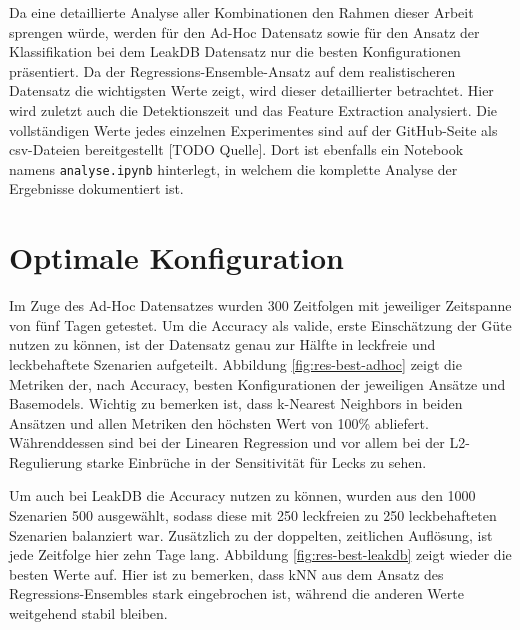Da eine detaillierte Analyse aller Kombinationen den Rahmen dieser Arbeit sprengen würde, werden für den
 Ad-Hoc Datensatz sowie für den Ansatz der Klassifikation bei dem LeakDB Datensatz nur die besten Konfigurationen
 präsentiert. Da der Regressions-Ensemble-Ansatz auf dem realistischeren Datensatz die wichtigsten Werte zeigt,
 wird dieser detaillierter betrachtet. Hier wird zuletzt auch die Detektionszeit und das Feature Extraction
 analysiert. Die vollständigen Werte jedes einzelnen Experimentes sind auf der GitHub-Seite als csv-Dateien
 bereitgestellt [TODO Quelle]. Dort ist ebenfalls ein Notebook namens \texttt{analyse.ipynb} hinterlegt, in welchem
 die komplette Analyse der Ergebnisse dokumentiert ist.

\section{Optimale Konfiguration}

Im Zuge des Ad-Hoc Datensatzes wurden 300 Zeitfolgen mit jeweiliger Zeitspanne von fünf Tagen getestet. Um die
 Accuracy als valide, erste Einschätzung der Güte nutzen zu können, ist der Datensatz genau zur Hälfte in
 leckfreie und leckbehaftete Szenarien aufgeteilt. Abbildung \ref{fig:res-best-adhoc} zeigt die Metriken der, nach
 Accuracy, besten Konfigurationen der jeweiligen Ansätze und Basemodels.
 Wichtig zu bemerken ist, dass k-Nearest Neighbors in beiden Ansätzen und allen Metriken den höchsten Wert von
 100\% abliefert. Währenddessen sind bei der Linearen Regression und vor allem bei der L2-Regulierung starke
 Einbrüche in der Sensitivität für Lecks zu sehen.

Um auch bei LeakDB die Accuracy nutzen zu können, wurden aus den 1000 Szenarien 500 ausgewählt, sodass diese
 mit 250 leckfreien zu 250 leckbehafteten Szenarien balanziert war. Zusätzlich zu der doppelten, zeitlichen
 Auflösung, ist jede Zeitfolge hier zehn Tage lang. Abbildung \ref{fig:res-best-leakdb} zeigt wieder die besten
 Werte auf. Hier ist zu bemerken, dass kNN aus dem Ansatz des Regressions-Ensembles stark eingebrochen ist,
 während die anderen Werte weitgehend stabil bleiben.

